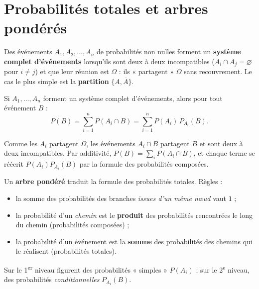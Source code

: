 \section{Probabilités totales et arbres pondérés}

\begin{definition}
Des événements $A_1,A_2,\dots,A_n$ de probabilités non nulles forment un
\textbf{système complet d'événements} lorsqu'ils sont deux à deux incompatibles
($A_i\cap A_j=\varnothing$ pour $i\ne j$) et que leur réunion est $\Omega$ : ils
« partagent » $\Omega$ sans recouvrement. Le cas le plus simple est la
\textbf{partition} $\{A,\overline A\}$.
\end{definition}

\begin{theoreme}
Si $A_1,\dots,A_n$ forment un système complet d'événements, alors pour tout
événement $B$ :
\[
P(B)=\sum_{i=1}^{n}P(A_i\cap B)=\sum_{i=1}^{n}P(A_i)\,P_{A_i}(B).
\]
\end{theoreme}

\begin{remarque}[Justification]
Comme les $A_i$ partagent $\Omega$, les événements $A_i\cap B$ partagent $B$ et
sont deux à deux incompatibles. Par additivité, $P(B)=\sum_i P(A_i\cap B)$, et
chaque terme se réécrit $P(A_i)P_{A_i}(B)$ par la formule des probabilités
composées.
\end{remarque}

\begin{aretenir}
Un \textbf{arbre pondéré} traduit la formule des probabilités totales. Règles :
\begin{itemize}
\item la somme des probabilités des branches \emph{issues d'un même n\oe ud} vaut $1$ ;
\item la probabilité d'un \emph{chemin} est le \textbf{produit} des probabilités
rencontrées le long du chemin (probabilités composées) ;
\item la probabilité d'un événement est la \textbf{somme} des probabilités des
chemins qui le réalisent (probabilités totales).
\end{itemize}
Sur le 1\textsuperscript{er} niveau figurent des probabilités « simples »
$P(A_i)$ ; sur le 2\textsuperscript{e} niveau, des probabilités
\emph{conditionnelles} $P_{A_i}(B)$.
\end{aretenir}

